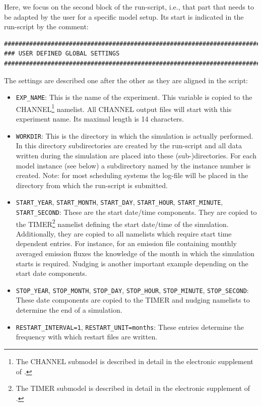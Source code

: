 \documentclass[11pt,twoside]{article}
\begin{document}
Here, we focus on the second block of the run-script,
i.e., that part that needs to be adapted by the user for a specific model setup.
Its start is indicated in the run-script by the comment:
\begin{verbatim}
#############################################################################
### USER DEFINED GLOBAL SETTINGS
#############################################################################
\end{verbatim}
The settings are described one after the other  as they are
aligned in the script: 
\begin{itemize}
\item \verb|EXP_NAME|: This is the name of the experiment. This variable is
copied to the CHANNEL\footnote{The CHANNEL submodel is described in detail in the
electronic supplement of \cite{Joeckel10a}.}  namelist. All CHANNEL output files 
will start with this
experiment name. Its maximal length is 14 characters.
\item \verb|WORKDIR|: This is the directory in which the simulation is actually
performed. In this directory subdirectories are created by the run-script and all
 data written during the simulation are placed into these (sub-)directories.
For each model instance (see below) a subdirectory named by the instance number
is created.
 Note: for most scheduling systems the log-file will be placed in the directory 
from which the run-script is submitted.
\item \verb|START_YEAR|, \verb|START_MONTH|, \verb|START_DAY|, \verb|START_HOUR|, \verb|START_MINUTE|, \verb|START_SECOND|:
These are the start date/time components. They are copied to the 
TIMER\footnote{The TIMER submodel is described in detail in the
electronic supplement of \cite{Joeckel10a}.} namelist 
defining the start date/time of the simulation. Additionally, they are copied to
 all namelists which require start time dependent entries. For instance, for an 
emission file 
containing monthly averaged emission fluxes the knowledge of the month in which
the simulation starts is required. Nudging is another important example 
depending on the start date components.
\item \verb|STOP_YEAR|, \verb|STOP_MONTH|, \verb|STOP_DAY|, \verb|STOP_HOUR|, \verb|STOP_MINUTE|, \verb|STOP_SECOND|:
These date components are copied to the TIMER and nudging namelists to
determine the end of a simulation.
\item \verb|RESTART_INTERVAL=1|, \verb|RESTART_UNIT=months|: These entries
determine the frequency with which restart files are written. 

\end{itemize}
\end{document}

